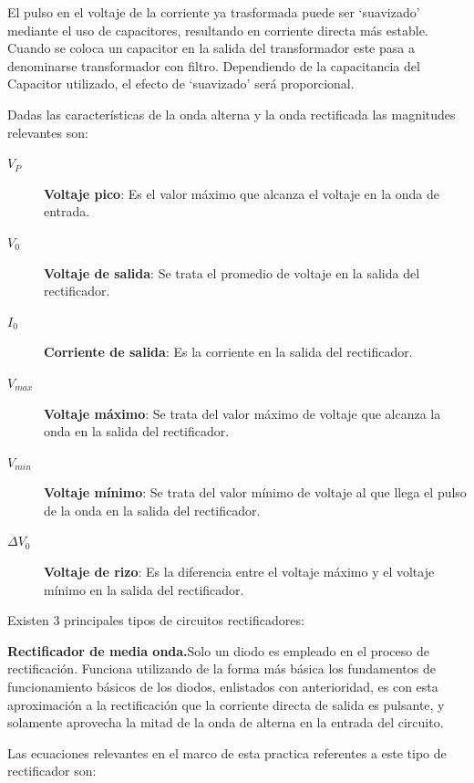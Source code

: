 \documentclass[12pt]{article}
\begin{document}
        El pulso en el voltaje de la corriente ya trasformada puede ser `suavizado' mediante el uso de
        capacitores, resultando en corriente directa más estable. Cuando se coloca un capacitor en la salida del 
        transformador este pasa a denominarse transformador con filtro. Dependiendo de la capacitancia del Capacitor
        utilizado, el efecto de `suavizado' será proporcional.\par
        Dadas las características de la onda alterna y la onda rectificada las magnitudes relevantes son:\par
        \begin{description}
            \item[$V_P$] \quad \textbf{Voltaje pico}: Es el valor máximo que alcanza el voltaje en la onda de entrada.
            \item[$V_0$] \quad  \textbf{Voltaje de salida}: Se trata el promedio de voltaje en la salida del rectificador.
            \item[$I_0$] \quad  \textbf{Corriente de salida}: Es la corriente en la salida del rectificador.
            \item[$V_{max}$] \quad  \textbf{Voltaje máximo}: Se trata del valor máximo de voltaje que alcanza la onda en la salida del rectificador.
            \item[$V_{min}$] \quad  \textbf{Voltaje mínimo}: Se trata del valor mínimo de voltaje al que llega el pulso de la onda en la salida del rectificador.
            \item[$\Delta V_0$] \quad  \textbf{Voltaje de rizo}: Es la diferencia entre el voltaje máximo y el voltaje mínimo en la salida del rectificador.
        \end{description}
        Existen 3 principales tipos de circuitos rectificadores:\par
            \textbf{Rectificador de media onda.}Solo un diodo es empleado en el proceso de rectificación. Funciona utilizando de la forma más
            básica los fundamentos de funcionamiento básicos de los diodos, enlistados con anterioridad, es
            con esta aproximación a la rectificación que la corriente directa de salida es pulsante, y solamente
            aprovecha la mitad de la onda de alterna en la entrada del circuito.\par
            Las ecuaciones relevantes en el marco de esta practica referentes a este tipo de rectificador son:\par
\end{document}
